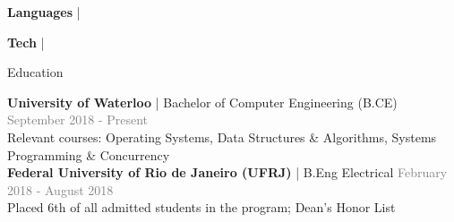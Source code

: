 \documentclass[hidelinks]{resume} %
\begin{document}
\vspace{-.1cm}
\begin{rSubsection}{\textbf{Languages} | }{}{}

\end{rSubsection}
\vspace{-.2cm}
\begin{rSubsection}{\textbf{Tech} | }{}{}

\end{rSubsection}

\vspace{-.20cm}

\begin{rSection}{Education}

{\textbf{University of Waterloo} {| Bachelor of Computer Engineering (B.CE)}} \hfill {\textcolor{gray}{September 2018 - Present}} 
\\ {Relevant courses: Operating Systems, Data Structures \& Algorithms, Systems Programming \& Concurrency}
\vspace{5px}
\\{\textbf{Federal University of Rio de Janeiro (UFRJ)}{ | B.Eng Electrical}} \hfill {\textcolor{gray}{February 2018 - August 2018}} 
\\ {Placed 6th of all admitted students in the program; Dean's Honor List}\hfill
\vspace{.1cm}
\end{rSection}

\vspace{-.20cm}
\end{document}
